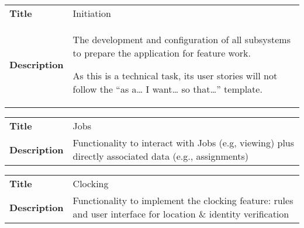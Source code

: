 \newcommand{\epic}[2]
{
  \begin{tabular}{p{0.2\linewidth}p{0.8\linewidth}}
    \textbf{Title}       & #1 \\
    \textbf{Description} & #2 \\
  \end{tabular}
}

\epic{Initiation}
{
  The development and configuration of all subsystems to
  prepare the application for feature work.

  As this is a technical task, its user stories will not
  follow the \enquote{as a\ldots{} I want\ldots{} so
    that\ldots{}} template.
} \hline

\epic{Jobs}
{
  Functionality to interact with Jobs (e.g, viewing)
  plus directly associated data (e.g., assignments)
} \hline

\epic{Clocking}
{
  Functionality to implement the clocking feature: rules
  and user interface for location \& identity
  verification
}